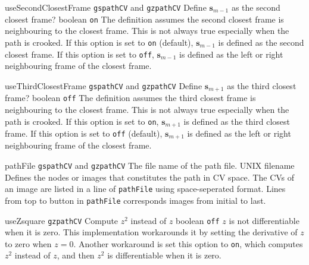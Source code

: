 \begin{cvcoptions}
\item %
  \keydef
    {useSecondClosestFrame}{%
    \texttt{gspathCV} and \texttt{gzpathCV}}{%
    Define $\mathbf{s}_{m-1}$ as the second closest frame?}{%
    boolean}{%
    \texttt{on}}{%
    The definition assumes the second closest frame is neighbouring to the closest frame. This is not always true especially when the path is crooked. If this option is set to \texttt{on} (default), $\mathbf{s}_{m-1}$ is defined as the second closest frame. If this option is set to \texttt{off}, $\mathbf{s}_{m-1}$ is defined as the left or right neighbouring frame of the closest frame.
  }

\item %
  \keydef
    {useThirdClosestFrame}{%
    \texttt{gspathCV} and \texttt{gzpathCV}}{%
    Define $\mathbf{s}_{m+1}$ as the third closest frame?}{%
    boolean}{%
    \texttt{off}}{%
    The definition assumes the third closest frame is neighbouring to the closest frame. This is not always true especially when the path is crooked. If this option is set to \texttt{on}, $\mathbf{s}_{m+1}$ is defined as the third closest frame. If this option is set to \texttt{off} (default), $\mathbf{s}_{m+1}$ is defined as the left or right neighbouring frame of the closest frame.
  }

\item %
  \key
    {pathFile}{%
    \texttt{gspathCV} and \texttt{gzpathCV}}{%
    The file name of the path file.}{%
    UNIX filename}{%
		Defines the nodes or images that constitutes the path in CV space. The CVs of an image are listed in a line of \texttt{pathFile} using space-seperated format. Lines from top to button in \texttt{pathFile} corresponds images from initial to last.
    }

\end{cvcoptions}


\begin{cvcoptions}

\item %
  \keydef
    {useZsquare}{%
    \texttt{gzpathCV}}{%
    Compute $z^2$ instead of $z$}{%
    boolean}{%
    \texttt{off}}{%
    $z$ is not differentiable when it is zero. This implementation workarounds it by setting the derivative of $z$ to zero when $z = 0$. Another workaround is set this option to \texttt{on}, which computes $z^2$ instead of $z$, and then $z^2$ is differentiable when it is zero.
  }

\end{cvcoptions}

